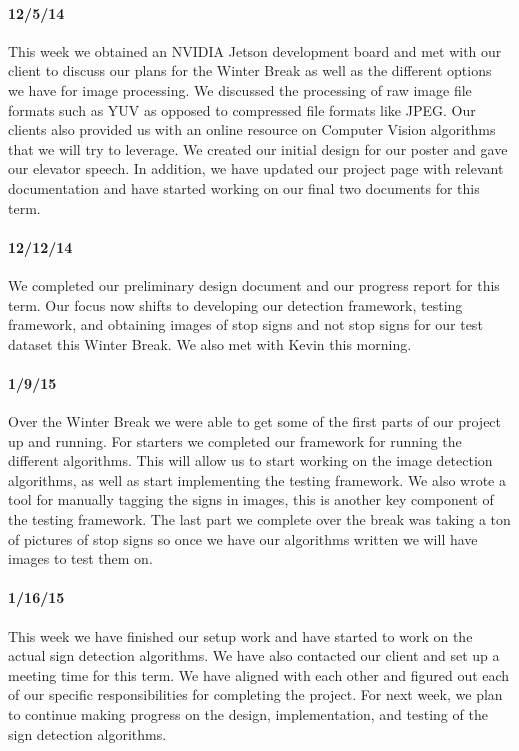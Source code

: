 \documentclass[letterpaper,10pt,titlepage]{article}
\begin{document}
    \paragraph*{12/5/14}
    This week we obtained an NVIDIA Jetson development board and met with our 
    client to discuss our plans for the Winter Break as well as the different
    options we have for image processing. We discussed the processing of raw 
    image file formats such as YUV as opposed to compressed file formats like 
    JPEG. Our clients also provided us with an online resource on Computer
    Vision algorithms that we will try to leverage. We created our initial 
    design for our poster and gave our elevator speech. In addition, we have 
    updated our project page with relevant documentation and have started 
    working on our final two documents for this term. 
    \paragraph*{12/12/14}
    We completed our preliminary design document and our progress report for
    this term. Our focus now shifts to developing our detection framework, 
    testing framework, and obtaining images of stop signs and not stop signs 
    for our test dataset this Winter Break. We also met with Kevin this 
    morning.
    \paragraph*{1/9/15}
    Over the Winter Break we were able to get some of the first parts of our
    project up and running. For starters we completed our framework for 
    running the different algorithms. This will allow us to start working on 
    the image detection algorithms, as well as start implementing the testing
    framework. We also wrote a tool for manually tagging the signs in images,
    this is another key component of the testing framework. The last part we 
    complete over the break was taking a ton of pictures of stop signs so once
    we have our algorithms written we will have images to test them on. 
    \paragraph*{1/16/15}
    This week we have finished our setup work and have started to work on the
    actual sign detection algorithms. We have also contacted our client and set
    up a meeting time for this term. We have aligned with each other and 
    figured out each of our specific responsibilities for completing the 
    project. For next week, we plan to continue making progress on the design,
    implementation, and testing of the sign detection algorithms. 
\end{document}
